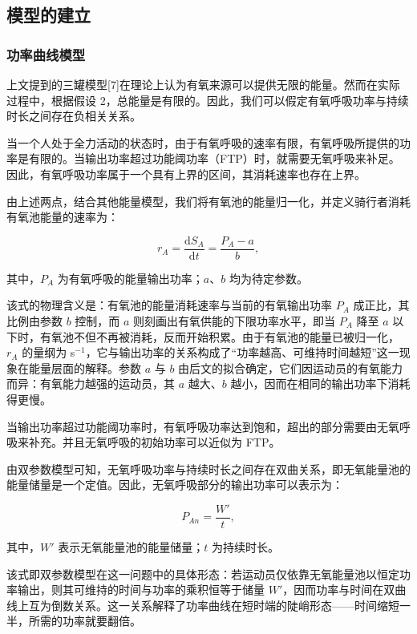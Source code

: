 \documentclass[11pt,a4paper]{ctexart}
\begin{document}
\subsection{模型的建立}

\subsubsection{功率曲线模型}

上文提到的三罐模型[7]在理论上认为有氧来源可以提供无限的能量。然而在实际过程中，根据假设 2，总能量是有限的。因此，我们可以假定有氧呼吸功率与持续时长之间存在负相关关系。

当一个人处于全力活动的状态时，由于有氧呼吸的速率有限，有氧呼吸所提供的功率是有限的。当输出功率超过功能阈功率（FTP）时，就需要无氧呼吸来补足。因此，有氧呼吸功率属于一个具有上界的区间，其消耗速率也存在上界。

由上述两点，结合其他能量模型，我们将有氧池的能量归一化，并定义骑行者消耗有氧池能量的速率为：

\begin{equation}
r_A = \frac{\mathrm{d}S_A}{\mathrm{d}t} = \frac{P_A - a}{b},
\end{equation}

其中，$P_A$ 为有氧呼吸的能量输出功率；$a$、$b$ 均为待定参数。

该式的物理含义是：有氧池的能量消耗速率与当前的有氧输出功率 $P_A$ 成正比，其比例由参数 $b$ 控制，而 $a$ 则刻画出有氧供能的下限功率水平，即当 $P_A$ 降至 $a$ 以下时，有氧池不但不再被消耗，反而开始积累。由于有氧池的能量已被归一化，$r_A$ 的量纲为 s$^{-1}$，它与输出功率的关系构成了“功率越高、可维持时间越短”这一现象在能量层面的解释。参数 $a$ 与 $b$ 由后文的拟合确定，它们因运动员的有氧能力而异：有氧能力越强的运动员，其 $a$ 越大、$b$ 越小，因而在相同的输出功率下消耗得更慢。

当输出功率超过功能阈功率时，有氧呼吸功率达到饱和，超出的部分需要由无氧呼吸来补充。并且无氧呼吸的初始功率可以近似为 FTP。

由双参数模型可知，无氧呼吸功率与持续时长之间存在双曲关系，即无氧能量池的能量储量是一个定值。因此，无氧呼吸部分的输出功率可以表示为：

\begin{equation}
P_{An} = \frac{W'}{t},
\end{equation}

其中，$W'$ 表示无氧能量池的能量储量；$t$ 为持续时长。

该式即双参数模型在这一问题中的具体形态：若运动员仅依靠无氧能量池以恒定功率输出，则其可维持的时间与功率的乘积恒等于储量 $W'$，因而功率与时间在双曲线上互为倒数关系。这一关系解释了功率曲线在短时端的陡峭形态——时间缩短一半，所需的功率就要翻倍。
\end{document}
